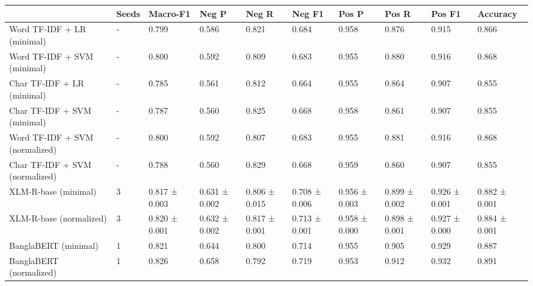 \begin{tabular}{llllllllll}
\toprule
 & Seeds & Macro-F1 & Neg P & Neg R & Neg F1 & Pos P & Pos R & Pos F1 & Accuracy \\
\midrule
Word TF-IDF + LR (minimal) & - & 0.799 & 0.586 & 0.821 & 0.684 & 0.958 & 0.876 & 0.915 & 0.866 \\
Word TF-IDF + SVM (minimal) & - & 0.800 & 0.592 & 0.809 & 0.683 & 0.955 & 0.880 & 0.916 & 0.868 \\
Char TF-IDF + LR (minimal) & - & 0.785 & 0.561 & 0.812 & 0.664 & 0.955 & 0.864 & 0.907 & 0.855 \\
Char TF-IDF + SVM (minimal) & - & 0.787 & 0.560 & 0.825 & 0.668 & 0.958 & 0.861 & 0.907 & 0.855 \\
Word TF-IDF + SVM (normalized) & - & 0.800 & 0.592 & 0.807 & 0.683 & 0.955 & 0.881 & 0.916 & 0.868 \\
Char TF-IDF + SVM (normalized) & - & 0.788 & 0.560 & 0.829 & 0.668 & 0.959 & 0.860 & 0.907 & 0.855 \\
XLM-R-base (minimal) & 3 & 0.817 ± 0.003 & 0.631 ± 0.002 & 0.806 ± 0.015 & 0.708 ± 0.006 & 0.956 ± 0.003 & 0.899 ± 0.002 & 0.926 ± 0.001 & 0.882 ± 0.001 \\
XLM-R-base (normalized) & 3 & 0.820 ± 0.001 & 0.632 ± 0.002 & 0.817 ± 0.001 & 0.713 ± 0.001 & 0.958 ± 0.000 & 0.898 ± 0.001 & 0.927 ± 0.000 & 0.884 ± 0.001 \\
BanglaBERT (minimal) & 1 & 0.821 & 0.644 & 0.800 & 0.714 & 0.955 & 0.905 & 0.929 & 0.887 \\
BanglaBERT (normalized) & 1 & 0.826 & 0.658 & 0.792 & 0.719 & 0.953 & 0.912 & 0.932 & 0.891 \\
\bottomrule
\end{tabular}
